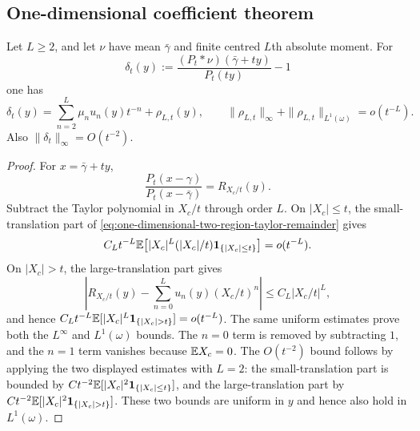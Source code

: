 \subsection{One-dimensional coefficient theorem}

\begin{lemma}%
\label{lem:exact-moment-density-truncation}
Let \(L\ge2\), and let \(\nu\) have mean \(\bar{\gamma}\) and finite centred
\(L\)th absolute moment.  For
\[
\delta_t(y):=
\frac{(P_t*\nu)(\bar{\gamma}+ty)}{P_t(ty)}-1
\]
one has
\begin{equation}\label{eq:exact-moment-density-truncation}
\delta_t(y)=\sum_{n=2}^{L}\mu_nu_n(y)t^{-n}+\rho_{L,t}(y),
\qquad
\|\rho_{L,t}\|_{\infty}+\|\rho_{L,t}\|_{L^1(\omega)}=o(t^{-L}).
\end{equation}
Also \(\|\delta_t\|_\infty=O(t^{-2})\).
\end{lemma}

\ifdefined\JFAArticleMain
{}
\else
\begin{proof}
For \(x=\bar{\gamma}+ty\),
\[
\frac{P_t(x-\gamma)}{P_t(x-\bar{\gamma})}
=R_{X_c/t}(y).
\]
Subtract the Taylor polynomial in \(X_c/t\) through order \(L\).  On
\(|X_c|\le t\), the small-translation part of
\eqref{eq:one-dimensional-two-region-taylor-remainder} gives
\[
C_Lt^{-L}\mathbb{E}\!\left[|X_c|^L(|X_c|/t)\mathbf1_{\{|X_c|\le t\}}\right]
=o(t^{-L}).
\]
On \(|X_c|>t\), the large-translation part gives
\[
\left|R_{X_c/t}(y)-\sum_{n=0}^{L}u_n(y)(X_c/t)^n\right|
\le C_L|X_c/t|^L,
\]
and hence \(C_Lt^{-L}\EE[|X_c|^L\mathbf1_{\{|X_c|>t\}}]=o(t^{-L})\).  The same
uniform estimates prove both the \(L^\infty\) and \(L^1(\omega)\) bounds.  The
\(n=0\) term is removed by subtracting \(1\), and the \(n=1\) term vanishes
because \(\mathbb{E} X_c=0\).  The \(O(t^{-2})\) bound follows by applying the two
displayed estimates with \(L=2\): the small-translation part is bounded by
\(Ct^{-2}\mathbb{E}[|X_c|^2\mathbf1_{\{|X_c|\le t\}}]\), and the
large-translation part by
\(Ct^{-2}\EE[|X_c|^2\mathbf1_{\{|X_c|>t\}}]\).  These two bounds are
uniform in \(y\) and hence also hold in \(L^1(\omega)\).
\end{proof}
\fi

